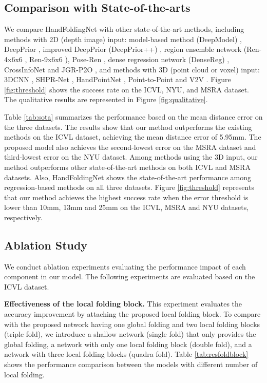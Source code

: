 \documentclass[10pt,twocolumn,letterpaper]{article}
\begin{document}
\subsection{Comparison with State-of-the-arts}

We compare HandFoldingNet with other state-of-the-art methods, including methods with 2D (depth image) input: model-based method (DeepModel) \cite{zhou2016model}, DeepPrior \cite{oberweger2015hands}, improved DeepPrior (DeepPrior++) \cite{oberweger2017deepprior++}, region ensemble network (Ren-4x6x6 \cite{guo2017region}, Ren-9x6x6 \cite{wan2018dense}), Pose-Ren \cite{chen2020pose}, dense regression network (DenseReg) \cite{wan2018dense}, CrossInfoNet \cite{du2019crossinfonet} and JGR-P2O \cite{fang2020jgr}, and methods with 3D (point cloud or voxel) input: 3DCNN \cite{ge20173d}, SHPR-Net \cite{chen2018shpr}, HandPointNet \cite{ge2018hand}, Point-to-Point \cite{ge2018point} and V2V \cite{moon2018v2v}. Figure \ref{fig:threshold} shows the success rate on the ICVL, NYU, and MSRA dataset.
The qualitative results are represented in Figure \ref{fig:qualitative}.


Table \ref{tab:sota} summarizes the performance based on the mean distance error on the three datasets. The results show that our method outperforms the existing methods on the ICVL dataset, achieving the mean distance error of 5.95mm. The proposed model also achieves the second-lowest error on the MSRA dataset and third-lowest error on the NYU dataset. Among methods using the 3D input, our method outperforms other state-of-the-art methods on both ICVL and MSRA datasets. Also, HandFoldingNet shows the state-of-the-art performance among regression-based methods on all three datasets. 
Figure \ref{fig:threshold} represents that our method achieves the highest success rate when the error threshold is lower than 10mm, 13mm and 25mm on the ICVL, MSRA and NYU datasets, respectively.





\subsection{Ablation Study}


We conduct ablation experiments evaluating the performance impact of each component in our model. The following experiments are evaluated based on the ICVL dataset.



\noindent
\textbf{Effectiveness of the local folding block.}
This experiment evaluates the accuracy improvement by attaching the proposed local folding block. To compare with the proposed network having one global folding and two local folding blocks (triple fold), we introduce a shallow network (single fold) that only provides the global folding, a network with only one local folding block (double fold), and a network with three local folding blocks (quadra fold). Table \ref{tab:resfoldblock} shows the performance comparison between the models with different number of local folding. 
\end{document}

